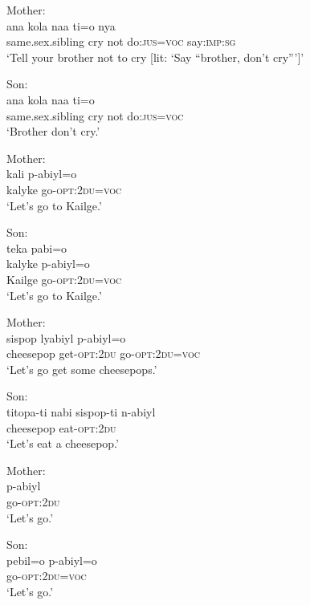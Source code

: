 \documentclass[output=paper]{langsci/langscibook}
\begin{document}
\begin{exe}
	\ex \label{ex:rumsey:ar25}
	\begin{xlist}
	\ex Mother:\label{ex:rumsey:ar25a}\\
	\gll ana kola naa ti=o nya\\
	same.sex.sibling cry not do:\textsc{jus}=\textsc{voc} say:\textsc{imp}:\textsc{sg}\\
	\trans ‘Tell your brother not to cry [lit: ‘Say “brother, don’t cry”’]’ 	
	
	\ex Son:\label{ex:rumsey:ar25b}\\
	\gll ana kola naa ti=o\\
	same.sex.sibling cry not do:\textsc{jus}=\textsc{voc}\\
	\trans ‘Brother don’t cry.’
	
	\ex Mother:\label{ex:rumsey:ar25c}\\
	\gll kali p-abiyl=o\\
	kalyke go-\textsc{opt}:2\textsc{du}=\textsc{voc}\\
	\trans ‘Let’s go to Kailge.’
	
	\ex Son:\label{ex:rumsey:ar25d}\\
	\glll teka pabi=o\\
	kalyke p-abiyl=o\\
	Kailge go-\textsc{opt}:2\textsc{du}=\textsc{voc}\\
	\trans ‘Let’s go to Kailge.’
	
	\ex 	Mother: \label{ex:rumsey:ar25e}\\
	\gll sispop lyabiyl p-abiyl=o\\
	cheesepop get-\textsc{opt}:2\textsc{du} go-\textsc{opt}:2\textsc{du}=\textsc{voc}\\
	\trans ‘Let’s go get some cheesepops.’
	
	\ex Son:	\label{ex:rumsey:ar25f}\\
	\gll titopa-ti nabi sispop-ti n-abiyl\\
	cheesepop eat-\textsc{opt}:2\textsc{du}\\
	\trans ‘Let’s eat a cheesepop.’
	
	\ex Mother:\label{ex:rumsey:ar25g}\\
	\gll p-abiyl\\
	go-\textsc{opt}:2\textsc{du}\\
	\trans ‘Let’s go.’
	
	\ex Son:\label{ex:rumsey:ar25h}\\ 
	\gll pebil=o p-abiyl=o\\
	go-\textsc{opt}:2\textsc{du}=\textsc{voc}\\
	\trans ‘Let’s go.’
	

\end{xlist}
\end{exe}
\end{document}
